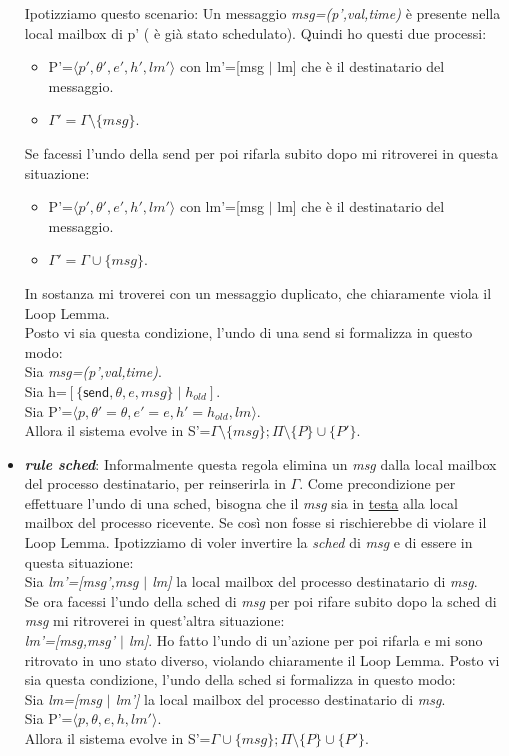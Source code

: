 \documentclass[background.tex]{subfiles}
\begin{document}
\begin{itemize}
		Ipotizziamo questo scenario:
		Un messaggio \textit{msg=(p',val,time)} è presente nella local mailbox di p' ( è già stato schedulato). Quindi ho questi due processi:
			\begin{itemize}
				\item P'=$\displaystyle \langle p',\theta',e',h',lm'\rangle$ con lm'=[msg  $\mid$ lm] che è il destinatario del messaggio.
				\item $\displaystyle \Gamma'=\Gamma\setminus\{msg\}$.
			\end{itemize}
		Se facessi l'undo della send per poi rifarla subito dopo mi ritroverei in questa situazione:
			\begin{itemize}
				\item P'=$\displaystyle \langle p',\theta',e',h',lm'\rangle$ con lm'=[msg  $\mid$ lm] che è il destinatario del messaggio.
				\item $\displaystyle \Gamma'=\Gamma\cup\{msg\}$.
			\end{itemize}
		In sostanza mi troverei con un messaggio duplicato, che chiaramente viola il Loop Lemma.\\
		Posto vi sia questa condizione, l'undo di una send si formalizza in questo modo:\\
		Sia \textit{msg=(p',val,time)}.\\
		Sia h=$\displaystyle [\{\mathsf{send},\theta,e,msg\} \mid h_{old}]$.\\
		Sia P'=$\displaystyle \langle p,\theta'=\theta,e'=e,h'=h_{old},lm \rangle$.\\
		Allora il sistema evolve in S'=$\displaystyle \Gamma\setminus\{msg\};\Pi\setminus\{P\}\cup\{P'\}$.
		\item \textit{\textbf{rule sched}}: Informalmente questa regola elimina un \textit{msg} dalla local mailbox del processo destinatario, per reinserirla in $\Gamma$.
		Come precondizione per effettuare l'undo di una sched, bisogna che il \textit{msg} sia in \underline{testa} alla local mailbox del processo ricevente. Se così non fosse si rischierebbe di violare il Loop Lemma.
		Ipotizziamo di voler invertire la \textit{sched} di \textit{msg} e di essere in questa situazione:\\
		Sia \textit{lm'=[msg',msg $\mid$ lm]} la local mailbox del processo destinatario di \textit{msg}.\\
		Se ora facessi l'undo della sched di \textit{msg} per poi rifare subito dopo la sched di \textit{msg} mi ritroverei in quest'altra situazione:\\
		\textit{lm'=[msg,msg' $\mid$ lm]}.
		Ho fatto l'undo di un'azione per poi rifarla e mi sono ritrovato in uno stato diverso, violando chiaramente il Loop Lemma.
		Posto vi sia questa condizione, l'undo della sched si formalizza in questo modo:\\
		Sia \textit{lm=[msg $\mid$ lm']} la local mailbox del processo destinatario di \textit{msg}.\\
		Sia P'=$\displaystyle \langle p,\theta,e,h,lm' \rangle$.\\
		Allora il sistema evolve in S'=$\displaystyle \Gamma\cup\{msg\};\Pi\setminus\{P\}\cup\{P'\}$.
	\end{itemize}
\end{document}
